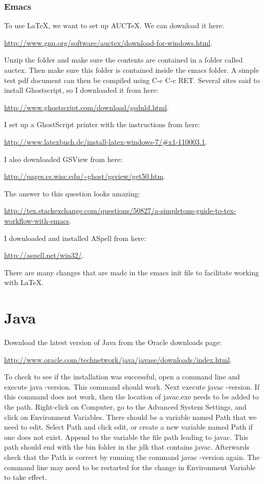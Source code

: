 \documentclass{article}
\newcommand{\web}[2]{
	\begin{center}
		\url{#1}{#2}
	\end{center}
}
\begin{document}
\subsubsection{Emacs}
\label{subsubsec:LaTeX_Emacs}

To use \LaTeX, we want to set up AUC\TeX.
We can download it here:
	\web{http://www.gnu.org/software/auctex/download-for-windows.html}.
Unzip the folder and make sure the contents are contained in a folder called auctex.
Then make sure this folder is contained inside the emacs folder.
A simple test pdf document can then be compiled using C-c C-c RET.
Several sites said to install Ghostscript, so I downloaded it from here:
	\web{http://www.ghostscript.com/download/gsdnld.html}.
I set up a GhostScript printer with the instructions from here:
	\web{http://www.latexbuch.de/install-latex-windows-7/\#x1-110003.1}.
I also downloaded GSView from here:
	\web{http://pages.cs.wisc.edu/~ghost/gsview/get50.htm}.

The answer to this question looks amazing:
	\web{http://tex.stackexchange.com/questions/50827/a-simpletons-guide-to-tex-workflow-with-emacs}.

I downloaded and installed ASpell from here:
	\web{http://aspell.net/win32/}.

There are many changes that are made in the emacs init file to facilitate working with \LaTeX.

\section{Java}

Download the latest version of Java from the Oracle downloads page:
 	\web{http://www.oracle.com/technetwork/java/javase/downloads/index.html}.
To check to see if the installation was successful, open a command line and execute java -version.
This command should work.
Next execute javac -version.
If this command does not work, then the location of javac.exe needs to be added to the path.
Right-click on Computer, go to the Advanced System Settings, and click on Environment Variables.
There should be a variable named Path that we need to edit.
Select Path and click edit, or create a new variable named Path if one does not exist.
Append to the variable the file path leading to javac.
This path should end with the bin folder in the jdk that contains javac.
Afterwards check that the Path is correct by running the command javac -version again.
The command line may need to be restarted for the change in Environment Variable to take effect.
\end{document}
